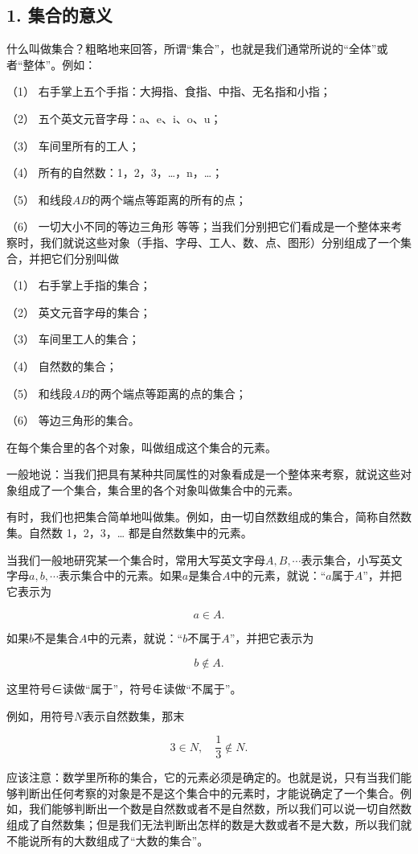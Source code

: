 \subsection{1. 集合的意义}

什么叫做集合？粗略地来回答，所谓``集合''，也就是我们通常所说的``全体''或者``整体''。例如：

（1） 右手掌上五个手指：大拇指、食指、中指、无名指和小指；

（2） 五个英文元音字母：a、e、i、o、u；

（3） 车间里所有的工人；

（4） 所有的自然数：1，2，3，\ldots，n，\ldots；

（5） 和线段\(AB\)的两个端点等距离的所有的点；

（6） 一切大小不同的等边三角形
等等；当我们分别把它们看成是一个整体来考察时，我们就说这些对象（手指、字母、工人、数、点、图形）分别组成了一个集合，并把它们分别叫做

（1） 右手掌上手指的集合；

（2） 英文元音字母的集合；

（3） 车间里工人的集合；

（4） 自然数的集合；

（5） 和线段\(AB\)的两个端点等距离的点的集合；

（6） 等边三角形的集合。

在每个集合里的各个对象，叫做组成这个集合的元素。

一般地说：当我们把具有某种共同属性的对象看成是一个整体来考察，就说这些对象组成了一个集合，集合里的各个对象叫做集合中的元素。

有时，我们也把集合简单地叫做集。例如，由一切自然数组成的集合，简称自然数集。自然数
1，2，3，\ldots{} 都是自然数集中的元素。

当我们一般地研究某一个集合时，常用大写英文字母\(A, B, \cdots\)表示集合，小写英文字母\(a, b, \cdots\)表示集合中的元素。如果\(a\)是集合\(A\)中的元素，就说：``\(a\)属于\(A\)''，并把它表示为

\[
a \in A.
\]

如果\(b\)不是集合\(A\)中的元素，就说：``\(b\)不属于\(A\)''，并把它表示为

\[
b \notin A.
\]

这里符号∈读做``属于''，符号∉读做``不属于''。

例如，用符号\(N\)表示自然数集，那末

\[
3 \in N, \quad \frac{1}{3} \notin N.
\]

应该注意：数学里所称的集合，它的元素必须是确定的。也就是说，只有当我们能够判断出任何考察的对象是不是这个集合中的元素时，才能说确定了一个集合。例如，我们能够判断出一个数是自然数或者不是自然数，所以我们可以说一切自然数组成了自然数集；但是我们无法判断出怎样的数是大数或者不是大数，所以我们就不能说所有的大数组成了``大数的集合''。

